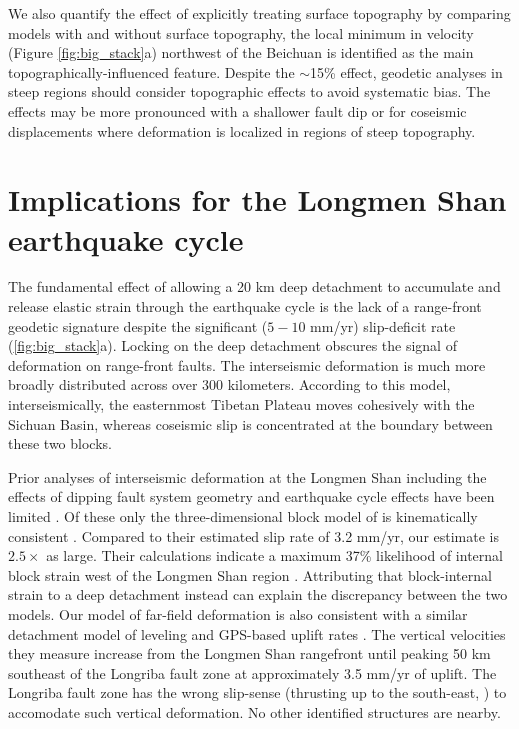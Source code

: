 \documentclass[12pt]{article}
\begin{document}
We also quantify the effect of explicitly treating surface topography by comparing models with and without surface topography, the local minimum in velocity (Figure \ref{fig:big_stack}a) northwest of the Beichuan is identified as the main topographically-influenced feature. Despite the ${\sim}$15\% effect, geodetic analyses in steep regions should consider topographic effects to avoid systematic bias. The effects may be more pronounced with a shallower fault dip or for coseismic displacements where deformation is localized in regions of steep topography.

\section{Implications for the Longmen Shan earthquake cycle}
The fundamental effect of allowing a 20 km deep detachment to accumulate and release elastic strain through the earthquake cycle is the lack of a range-front geodetic signature despite the significant ($5-10$ mm/yr) slip-deficit rate (\ref{fig:big_stack}a). Locking on the deep detachment obscures the signal of deformation on range-front faults. The interseismic deformation is much more broadly distributed across over 300 kilometers. According to this model, interseismically, the easternmost Tibetan Plateau moves cohesively with the Sichuan Basin, whereas coseismic slip is concentrated at the boundary between these two blocks.

Prior analyses of interseismic deformation at the Longmen Shan including the effects of dipping fault system geometry and earthquake cycle effects have been limited \citep{Loveless2011, Qi2011, Hao2014}. Of these only the three-dimensional block model of \citet{Loveless2011} is kinematically consistent \citep{minster87,mccaffrey02,Meade2005}. Compared to their estimated slip rate of 3.2 mm/yr, our estimate is $2.5 \times$ as large.  Their calculations indicate a maximum 37\% likelihood of internal block strain west of the Longmen Shan region \citep{Loveless2011}. Attributing that block-internal strain to a deep detachment instead can explain the discrepancy between the two models. Our model of far-field deformation is also consistent with a similar detachment model of leveling and GPS-based uplift rates \citep{Hao2014}. The vertical velocities they measure increase from the Longmen Shan rangefront until peaking 50 km southeast of the Longriba fault zone at approximately 3.5 mm/yr of uplift. The Longriba fault zone has the wrong slip-sense (thrusting up to the south-east, \citep{Ren2013}) to accomodate such vertical deformation. No other identified structures are nearby. 
\end{document}
